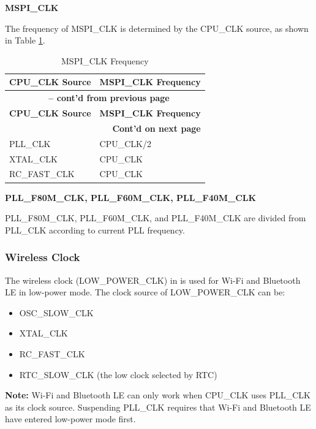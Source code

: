 \documentclass[main\_\_EN.tex]{subfiles}
\begin{document}
\textbf{MSPI\_CLK}

The frequency of MSPI\_CLK is determined by the CPU\_CLK source, as shown in Table \ref{table:mspi_clk_src}.

 \begin{longtable}[c]{ |p{5cm}|p{5cm}| }
      \caption{MSPI\_CLK Frequency}
    \label{table:mspi_clk_src} \\
        \hline
    \rowcolor{lightgray}
        \textbf{CPU\_CLK Source} & \textbf{MSPI\_CLK Frequency} \\
        \hline
        \endfirsthead
        \multicolumn{2}{c}{\bfseries \tablename\ \thetable{} -- cont'd from previous page}\\\hline

    \rowcolor{lightgray}
        \textbf{CPU\_CLK Source} & \textbf{MSPI\_CLK Frequency} \\\hline
        \endhead
        \multicolumn{2}{r}{\textbf{Cont'd on next page}} \\
        \endfoot
        \endlastfoot
        \hline
        PLL\_CLK & CPU\_CLK/2 \\
        \hline
        XTAL\_CLK & CPU\_CLK \\
        \hline
        RC\_FAST\_CLK & CPU\_CLK \\
        \hline
\end{longtable}

\textbf{PLL\_F80M\_CLK, PLL\_F60M\_CLK, PLL\_F40M\_CLK}

PLL\_F80M\_CLK, PLL\_F60M\_CLK, and PLL\_F40M\_CLK are divided from PLL\_CLK according to current PLL frequency.




\subsubsection{Wireless Clock}
The wireless clock (LOW\_POWER\_CLK) in \chipname{} is used for Wi-Fi and Bluetooth LE in low-power mode. The clock source of LOW\_POWER\_CLK can be:
\begin{itemize}
    \item OSC\_SLOW\_CLK
    \item XTAL\_CLK
    \item RC\_FAST\_CLK
    \item RTC\_SLOW\_CLK (the low clock selected by RTC)
\end{itemize}

\textbf{Note:} Wi-Fi and Bluetooth LE can only work when CPU\_CLK uses PLL\_CLK as its clock source. Suspending PLL\_CLK requires that Wi-Fi and Bluetooth LE have entered low-power mode first.
\end{document}
